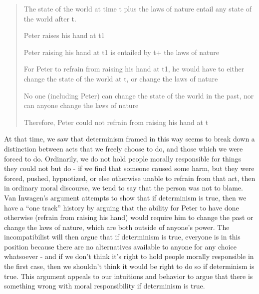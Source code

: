 \documentclass[phd,12pt,oneside,paper=letterpaper]{ubcthesis}
\begin{document}
\begin{quote}
The state of the world at time t plus the laws of nature entail any state of the world after t. 

Peter raises his hand at t1

Peter raising his hand at t1 is entailed by t+ the laws of nature

For Peter to refrain from raising his hand at t1, he would have to either change the state of the world at t, or change the laws of nature

No one (including Peter) can change the state of the world in the past, nor can anyone change the laws of nature

Therefore, Peter could not refrain from raising his hand at t
\end{quote}

At that time, we saw that determinism framed in this way seems to break down a distinction between acts that we freely choose to do, and those which we were forced to do. Ordinarily, we do not hold people morally responsible for things they could not but do - if we find that someone caused some harm, but they were forced, pushed, hypnotized, or else otherwise unable to refrain from that act, then in ordinary moral discourse, we tend to say that the person was not to blame. Van Inwagen's argument attempts to show that if determinism is true, then we have a ``one track'' history by arguing that the ability for Peter to have done otherwise (refrain from raising his hand) would require him to change the past or change the laws of nature, which are both outside of anyone's power. The incompatibilist will then argue that if determinism is true, everyone is in this position because there are no alternatives available to anyone for any choice whatsoever - and if we don't think it's right to hold people morally responsible in the first case, then we shouldn't think it would be right to do so if determinism is true. This argument appeals to our intuitions and behavior to argue that there is something wrong with moral responsibility if determinism is true.
\end{document}
